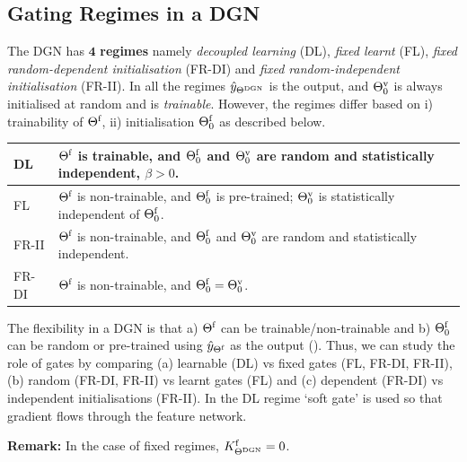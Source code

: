 \subsection{Gating Regimes in a DGN}
\begin{definition}\label{def:regime}The DGN has $\mathbf{4}$ \textbf{regimes} namely \emph{decoupled learning} (DL), \emph{fixed learnt} (FL), \emph{fixed random-dependent initialisation} (FR-DI) and \emph{fixed random-independent initialisation} (FR-II). 
In all the regimes $\hat{y}_{\Theta^{\text{DGN}}}$ is the output, and ${\Theta}^{\text{v}}_0$ is always initialised at random and is \emph{trainable}. However, the regimes differ based on i) trainability of $\Theta^{\textrm{f}}$, ii) initialisation $\Theta^{\textrm{f}}_0$ as described below.\\
\begin{tabular}{|l|p{6cm}|}\hline
DL               & $\Theta^{\textrm{f}}$ is trainable, and $\Theta^{\textrm{f}}_0$ and ${\Theta}^{\text{v}}_0$ are random and statistically independent,  $\beta>0$.\\\hline
FL               & $\Theta^{\textrm{f}}$ is non-trainable, and $\Theta^{\textrm{f}}_0$ is pre-trained;  ${\Theta}^{\text{v}}_0$ is statistically independent of $\Theta^{\textrm{f}}_0$. \\\hline
FR-II            & $\Theta^{\textrm{f}}$ is non-trainable, and $\Theta^{\textrm{f}}_0$ and ${\Theta}^{\text{v}}_0$ are random and statistically independent.\\\hline
FR-DI   &  $\Theta^{\textrm{f}}$ is non-trainable, and $\Theta^{\textrm{f}}_0={\Theta}^{\text{v}}_0$.\\\hline
\end{tabular}
\end{definition}
The flexibility in a DGN is that  a) $\Theta^{\textrm{f}}$ can be trainable/non-trainable and b) $\Theta^{\textrm{f}}_0$ can be random or pre-trained using $\hat{y}_{{\Theta}^{\text{f}}}$ as the output (). Thus, we can study the role of gates by comparing (a) learnable (DL) vs fixed gates (FL, FR-DI, FR-II), (b) random (FR-DI, FR-II) vs learnt gates (FL) and (c) dependent (FR-DI) vs independent initialisations (FR-II). In the DL regime `soft gate' is used so that gradient flows through the feature network.

\textbf{Remark:} In the case of fixed regimes, $K^{\text{f}}_{\Theta^{\text{DGN}}}=0$. 
